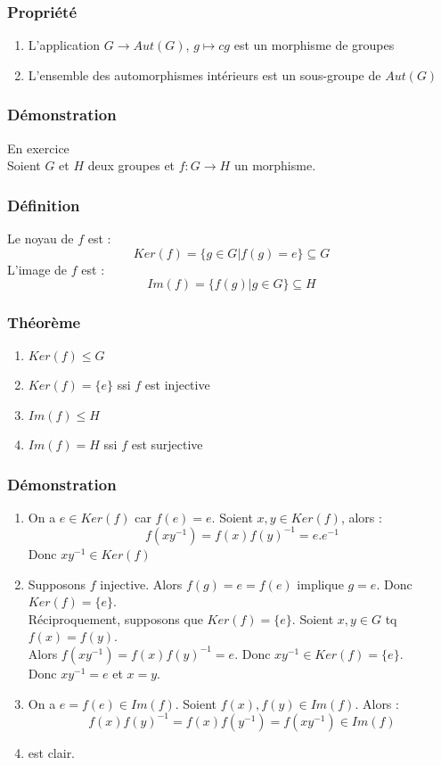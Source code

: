 \documentclass[a4paper, oneside]{report}
\newcommand{\mdg}{morphisme de groupes }
\newcommand{\auts}{automorphismes }
\begin{document}
\subsubsection{Propriété}
\begin{enumerate}
\item L'application $G\rightarrow Aut(G)$, $g\mapsto cg$ est un \mdg
\item L'ensemble des \auts intérieurs est un sous-groupe de $Aut(G)$
\end{enumerate}


\subsubsection{Démonstration}
En exercice\\

Soient $G$ et $H$ deux groupes et $f:G\rightarrow H$ un morphisme.

\subsubsection{Définition}
Le noyau de $f$ est :
$$Ker(f)=\{g\in G | f(g) =e \} \subseteq G$$
L'image de $f$ est :
$$Im(f)=\{f(g)| g\in G\} \subseteq H$$

\subsubsection{Théorème}
\begin{enumerate}
\item $Ker(f)\leq G$\\
\item $Ker(f)=\{e\}$ ssi $f$ est injective
\item $Im(f)\leq H$
\item $Im(f)=H$ ssi $f$ est surjective
\end{enumerate}

\subsubsection{Démonstration}
\begin{enumerate}
\item On a $e\in Ker(f)$ car $f(e)=e$. Soient $x,y\in Ker(f)$, alors :
$$f(xy^{-1})=f(x)f(y)^{-1}=e.e^{-1}$$
Donc $xy^{-1}\in Ker(f)$

\item Supposons $f$ injective. Alors $f(g)=e=f(e)$ implique $g=e$. Donc $Ker(f)=\{e\}$.\\
Réciproquement, supposons que $Ker(f)=\{e\}$. Soient $x,y\in G$ tq $f(x)=f(y)$.\\
Alors $f(xy^{-1})=f(x)f(y)^{-1}=e$. Donc $xy^{-1}\in Ker(f)=\{ e \}$.\\
Donc $xy^{-1}=e$ et $x=y$.

\item On a $e=f(e)\in Im(f)$. Soient $f(x),f(y)\in Im(f)$. Alors :
$$f(x)f(y)^{-1}=f(x)f(y^{-1})=f(xy^{-1})\in Im(f)$$

\item est clair.
\end{enumerate}
\end{document}
